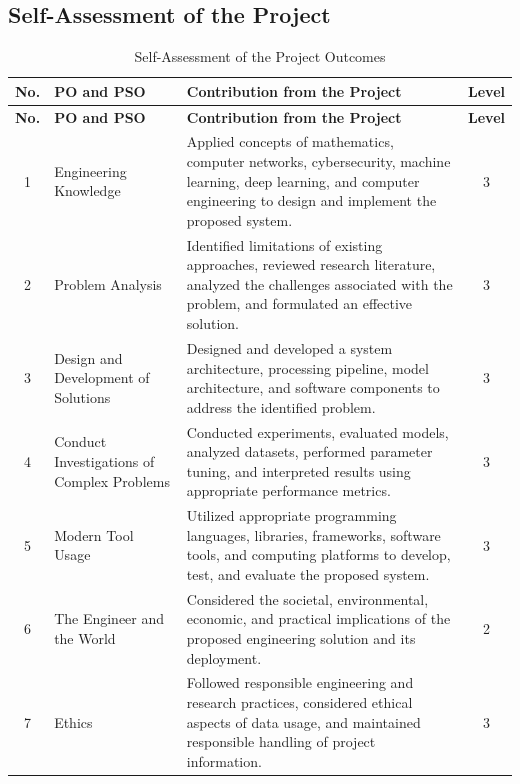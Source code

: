 \begin{appendices}
\section{Self-Assessment of the Project}

\begin{longtable}{|c|p{5.2cm}|p{7cm}|c|}
	\caption{Self-Assessment of the Project Outcomes}
	\label{tab:self-assessment}\\
	\hline
	\textbf{No.} & \textbf{PO and PSO} & \textbf{Contribution from the Project} & \textbf{Level} \\
	\hline
	\endfirsthead
	
	\hline
	\textbf{No.} & \textbf{PO and PSO} & \textbf{Contribution from the Project} & \textbf{Level} \\
	\hline
	\endhead
	
	1 &
	Engineering Knowledge &
	Applied concepts of mathematics, computer networks, cybersecurity,
	machine learning, deep learning, and computer engineering to design
	and implement the proposed system. &
	3 \\ \hline
	
	2 &
	Problem Analysis &
	Identified limitations of existing approaches, reviewed research literature,
	analyzed the challenges associated with the problem, and formulated an
	effective solution. &
	3 \\ \hline
	
	3 &
	Design and Development of Solutions &
	Designed and developed a system architecture, processing pipeline,
	model architecture, and software components to address the identified
	problem. &
	3 \\ \hline
	
	4 &
	Conduct Investigations of Complex Problems &
	Conducted experiments, evaluated models, analyzed datasets, performed
	parameter tuning, and interpreted results using appropriate performance
	metrics. &
	3 \\ \hline
	
	5 &
	Modern Tool Usage &
	Utilized appropriate programming languages, libraries, frameworks,
	software tools, and computing platforms to develop, test, and evaluate
	the proposed system. &
	3 \\ \hline
	
	6 &
	The Engineer and the World &
	Considered the societal, environmental, economic, and practical
	implications of the proposed engineering solution and its deployment. &
	2 \\ \hline
	
	7 &
	Ethics &
	Followed responsible engineering and research practices, considered
	ethical aspects of data usage, and maintained responsible handling
	of project information. &
	3 \\ \hline
	

\end{longtable}
\end{appendices}
